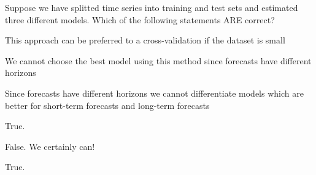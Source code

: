 
\begin{question}
Suppose we have splitted time series into training and test sets and estimated three different models. Which of the following statements ARE correct?
\begin{answerlist}
  \item This approach can be preferred to a cross-validation if the dataset is small
  \item We cannot choose the best model using this method since forecasts have different horizons
  \item Since forecasts have different horizons we cannot differentiate models which are better for short-term forecasts and long-term forecasts
\end{answerlist}
\end{question}

\begin{solution}
\begin{answerlist}
  \item True.
  \item False. We certainly can!
  \item True.
\end{answerlist}
\end{solution}

